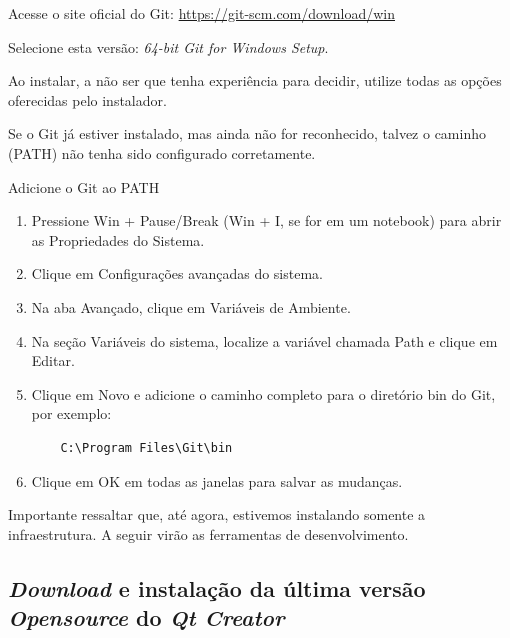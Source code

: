 \documentclass[a4paper,11pt]{article}
\newcommand{\qtcreator}{\textit{Qt Creator}}
\begin{document}
Acesse o site oficial do Git: \url{https://git-scm.com/download/win}

Selecione esta versão: \textit{64-bit Git for Windows Setup}.

Ao instalar, a não ser que tenha experiência para decidir, utilize todas as opções oferecidas pelo instalador.

Se o Git já estiver instalado, mas ainda não for reconhecido, talvez o caminho (PATH) não tenha sido configurado corretamente.

Adicione o Git ao PATH


\begin{enumerate}

	\item Pressione Win + Pause/Break (Win + I, se for em um notebook) para abrir as Propriedades do Sistema.
	\item Clique em Configurações avançadas do sistema.
	\item Na aba Avançado, clique em Variáveis de Ambiente.
	\item Na seção Variáveis do sistema, localize a variável chamada Path e clique em Editar.
	\item Clique em Novo e adicione o caminho completo para o diretório bin do Git, por exemplo:
	
	\begin{verbatim}
	C:\Program Files\Git\bin
	\end{verbatim}
	
	\item Clique em OK em todas as janelas para salvar as mudanças.

\end{enumerate}



Importante ressaltar que, até agora, estivemos instalando somente a infraestrutura.  A seguir virão as ferramentas de desenvolvimento.


\subsection{\textit{Download} e instalação da última versão \textit{Opensource} do \qtcreator{}}
\end{document}
